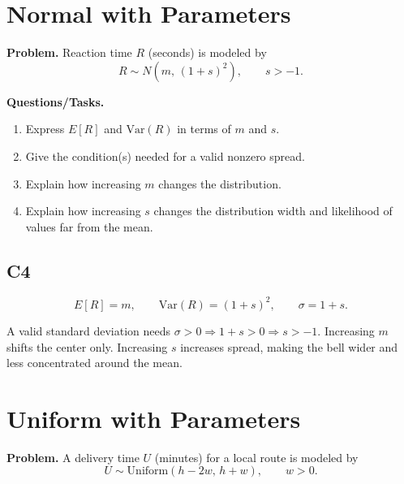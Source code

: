 \section{Normal with Parameters}

\textbf{Problem.}
Reaction time \(R\) (seconds) is modeled by
\[
R\sim N(m,\,(1+s)^2),\qquad s> -1.
\]

\textbf{Questions/Tasks.}
\begin{enumerate}[label=\textbf{\alph*)}]
  \item Express \(E[R]\) and \(\mathrm{Var}(R)\) in terms of \(m\) and \(s\).
  \item Give the condition(s) needed for a valid nonzero spread.
  \item Explain how increasing \(m\) changes the distribution.
  \item Explain how increasing \(s\) changes the distribution width and likelihood of values far from the mean.
\end{enumerate}

\subsection*{C4}
\[
E[R]=m,
\qquad
\mathrm{Var}(R)=(1+s)^2,
\qquad
\sigma=1+s.
\]
\begin{center}
\end{center}
A valid standard deviation needs \(\sigma>0\Rightarrow 1+s>0\Rightarrow s>-1\).
Increasing \(m\) shifts the center only. Increasing \(s\) increases spread, making the bell wider and less concentrated around the mean.

\section{Uniform with Parameters}

\textbf{Problem.}
A delivery time \(U\) (minutes) for a local route is modeled by
\[
U\sim \text{Uniform}(h-2w,\,h+w),\qquad w>0.
\]


